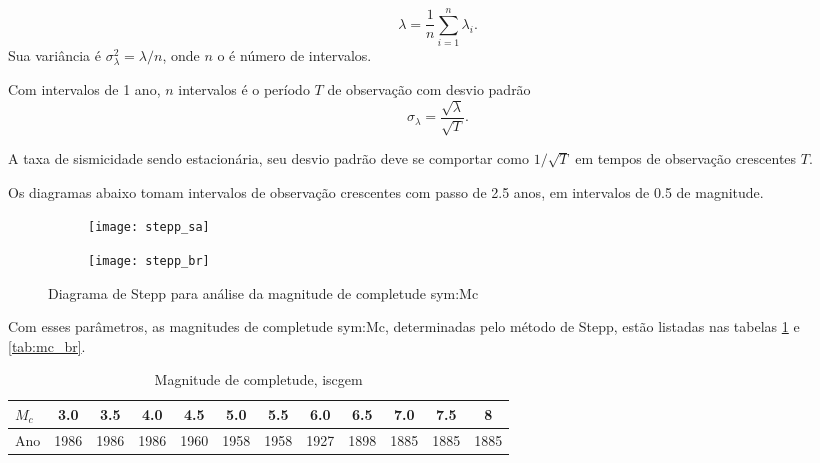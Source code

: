 \begin{equation}
	\ensuremath{
		\lambda =  \frac{1}{n}\sum_{i=1}^{n} \lambda_i.
	}
\label{eq:mwaf}
\end{equation}
Sua variância é $\sigma_{\lambda}^2 =  \lambda/n$, onde $n$ o é número de intervalos.

Com intervalos de 1 ano, $n$ intervalos é o período $T$ de observação com desvio padrão
\begin{equation}
	\ensuremath{
		 \sigma_{\lambda} = \frac{\sqrt{\lambda}}{\sqrt{T}}.
	}
\label{eq:mwaf}
\end{equation}

A taxa de sismicidade sendo estacionária, seu desvio padrão deve se comportar como $1/\sqrt{T}$ em 
tempos de observação crescentes $T$.

Os diagramas abaixo tomam intervalos de observação crescentes com passo de 2.5 anos,
em intervalos de 0.5 de magnitude.
\begin{figure}[H]
	\centering
	\begin{subfigure}[b]{0.47\textwidth}
		  	\centering
			\texttt{[image: stepp\_sa]}
			\label{fig:sa_stepp}
	\end{subfigure}%
	\quad %
	\begin{subfigure}[b]{0.47\textwidth}
		  	\centering
			\texttt{[image: stepp\_br]}
			\label{fig:br_stepp}
    \end{subfigure}%
	\caption{Diagrama de Stepp para análise da magnitude de completude \gls{sym:Mc}}
	\label{fig:eq_stepp}
\end{figure}

Com esses parâmetros, as magnitudes de completude \gls{sym:Mc}, determinadas pelo método
de Stepp, estão listadas nas tabelas \ref{tab:mc_sa} e \ref{tab:mc_br}.

	\begin{table}[h]
	  	\centering
		\begin{tabular}{l|*{11}{c}}
		$M_c$ & 3.0  & 3.5  & 4.0  & 4.5  & 5.0  & 5.5  & 6.0  & 6.5  & 7.0  & 7.5  & 8 \\  \hline
		Ano   & 1986 & 1986 & 1986 & 1960 & 1958 & 1958 & 1927 & 1898 & 1885 & 1885 & 1885   \\
		\end{tabular}
		\caption{Magnitude de completude, \gls{iscgem}}
		\label{tab:mc_sa}
	\end{table}

